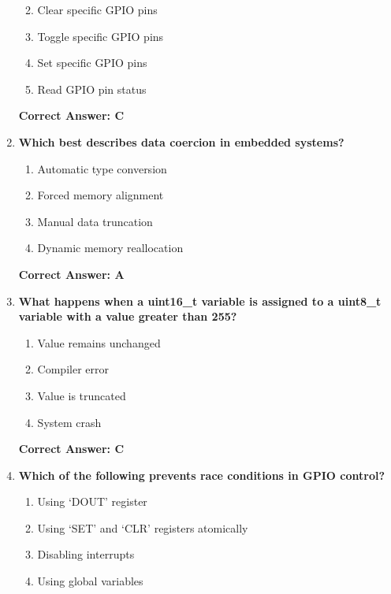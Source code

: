 \documentclass[
  9pt,
  letterpaper,
  abstract,
  titlepage]{scrbook}
\begin{document}
\begin{enumerate}
  \begin{enumerate}
  \def\labelenumii{\arabic{enumii}.}
  \item
    Clear specific GPIO pins
  \item
    Toggle specific GPIO pins
  \item
    Set specific GPIO pins
  \item
    Read GPIO pin status
  \end{enumerate}

  \textbf{Correct Answer: C}
\item
  \textbf{Which best describes data coercion in embedded systems?}

  \begin{enumerate}
  \def\labelenumii{\arabic{enumii}.}
  \item
    Automatic type conversion
  \item
    Forced memory alignment
  \item
    Manual data truncation
  \item
    Dynamic memory reallocation
  \end{enumerate}

  \textbf{Correct Answer: A}
\item
  \textbf{What happens when a uint16\_t variable is assigned to a
  uint8\_t variable with a value greater than 255?}

  \begin{enumerate}
  \def\labelenumii{\arabic{enumii}.}
  \item
    Value remains unchanged
  \item
    Compiler error
  \item
    Value is truncated
  \item
    System crash
  \end{enumerate}

  \textbf{Correct Answer: C}
\item
  \textbf{Which of the following prevents race conditions in GPIO
  control?}

  \begin{enumerate}
  \def\labelenumii{\arabic{enumii}.}
  \item
    Using `DOUT' register
  \item
    Using `SET' and `CLR' registers atomically
  \item
    Disabling interrupts
  \item
    Using global variables
  \end{enumerate}


\end{enumerate}
\end{document}
